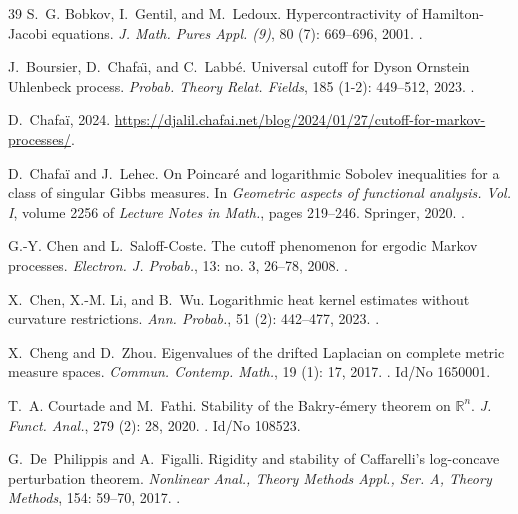 \documentclass[10pt,reqno]{amsart}
\numberwithin{equation}{section}
\begin{document}
\begin{thebibliography}{39}
S.~G. Bobkov, I.~Gentil, and M.~Ledoux.
\newblock Hypercontractivity of {Hamilton}-{Jacobi} equations.
\newblock \emph{J. Math. Pures Appl. (9)}, 80 (7): 669--696,
  2001.
\newblock {}.

J.~Boursier, D.~Chafa{\"{\i}}, and C.~Labb{\'e}.
\newblock Universal cutoff for {Dyson} {Ornstein} {Uhlenbeck} process.
\newblock \emph{Probab. Theory Relat. Fields}, 185 (1-2):
  449--512, 2023.
\newblock {}.

D.~Chafaï, 2024.
\newblock
  \url{https://djalil.chafai.net/blog/2024/01/27/cutoff-for-markov-processes/}.

D.~Chafaï and J.~Lehec.
\newblock On {P}oincar\'e{} and logarithmic {S}obolev inequalities for a class
  of singular {G}ibbs measures.
\newblock In \emph{Geometric aspects of functional analysis. {V}ol. {I}},
  volume 2256 of \emph{Lecture Notes in Math.}, pages 219--246. Springer, 2020.
\newblock {}.

G.-Y. Chen and L.~Saloff-Coste.
\newblock The cutoff phenomenon for ergodic {M}arkov processes.
\newblock \emph{Electron. J. Probab.}, 13: no. 3, 26--78, 2008.
\newblock {}.

X.~Chen, X.-M. Li, and B.~Wu.
\newblock Logarithmic heat kernel estimates without curvature restrictions.
\newblock \emph{Ann. Probab.}, 51 (2): 442--477, 2023.
\newblock {}.

X.~Cheng and D.~Zhou.
\newblock Eigenvalues of the drifted {Laplacian} on complete metric measure
  spaces.
\newblock \emph{Commun. Contemp. Math.}, 19 (1): 17, 2017.
\newblock {}.
\newblock Id/No 1650001.

T.~A. Courtade and M.~Fathi.
\newblock Stability of the {Bakry}-{\'e}mery theorem on {{\(\mathbb{R}^n\)}}.
\newblock \emph{J. Funct. Anal.}, 279 (2): 28, 2020.
\newblock {}.
\newblock Id/No 108523.

G.~De~Philippis and A.~Figalli.
\newblock Rigidity and stability of {Caffarelli}'s log-concave perturbation
  theorem.
\newblock \emph{Nonlinear Anal., Theory Methods Appl., Ser. A, Theory Methods},
  154: 59--70, 2017.
\newblock {}.


\end{thebibliography}
\end{document}
